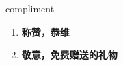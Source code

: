 
\begin{frame}
{\huge compliment}
\begin{center}
\begin{enumerate}\Large
  \item \textbf{称赞，恭维}
  \item \textbf{敬意，免费赠送的礼物}
\end{enumerate}
\end{center}
\end{frame}
